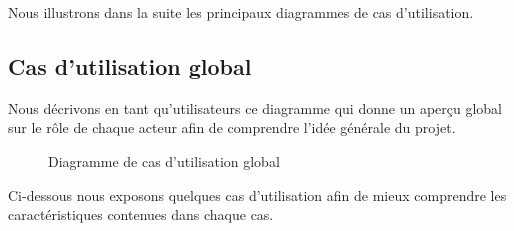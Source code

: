 			Nous illustrons dans la suite les principaux diagrammes de cas d'utilisation.
			
			
			\subsection{Cas d'utilisation global }
			
			Nous décrivons en tant qu'utilisateurs ce diagramme  qui donne un aperçu global sur le rôle de chaque acteur afin de comprendre l'idée générale du projet.
			
			
			\begin {figure} [H]
			\begin{center}
	\centering
\hspace*{-1.3cm}
			\end{center}
		    \caption{Diagramme de cas d'utilisation global}
	        \end {figure}
			
			Ci-dessous nous exposons quelques cas d'utilisation afin de mieux comprendre les caractéristiques contenues dans chaque cas.
			
